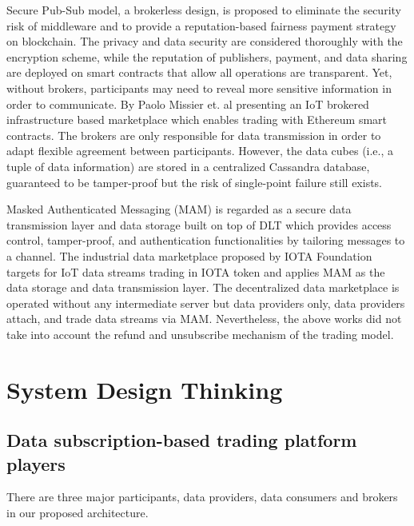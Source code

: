\documentclass[10pt, conference, compsocconf]{IEEEtran}
\begin{document}
Secure Pub-Sub model\cite{SPS}, a brokerless design, is proposed to eliminate the security risk of middleware and to provide a reputation-based fairness payment strategy on blockchain.
The privacy and data security are considered thoroughly with the encryption scheme, while the reputation of publishers, payment, and data sharing are deployed on smart contracts that allow all operations are transparent. Yet, without brokers, participants may need to reveal more sensitive information in order to communicate. By Paolo Missier et. al\cite{MindMyValue} presenting an IoT brokered infrastructure based marketplace which enables trading with Ethereum smart contracts. The brokers are only responsible for data transmission in order to adapt flexible agreement between participants. However, the data cubes (i.e., a tuple of data information) are stored in a centralized Cassandra database, guaranteed to be tamper-proof but the risk of single-point failure still exists.

Masked Authenticated Messaging (MAM)\cite{MAM} is regarded as a secure data transmission layer and data storage built on top of DLT which provides access control, tamper-proof, and authentication functionalities by tailoring messages to a channel. The industrial data marketplace\cite{IOTAIdustryMarketplace} proposed by IOTA Foundation targets for IoT data streams trading in IOTA token and applies MAM as the data storage and data transmission layer. The decentralized data marketplace\cite{DDMSmartCities} is operated without any intermediate server but data providers only, data providers attach, and trade data streams via MAM. Nevertheless, the above works did not take into account the refund and unsubscribe mechanism of the trading model.
 
\section{System Design Thinking}
\label{section:design_thinking}
\subsection{Data subscription-based trading platform players}
There are three major participants, data providers, data consumers and brokers in our proposed architecture.
\end{document}
